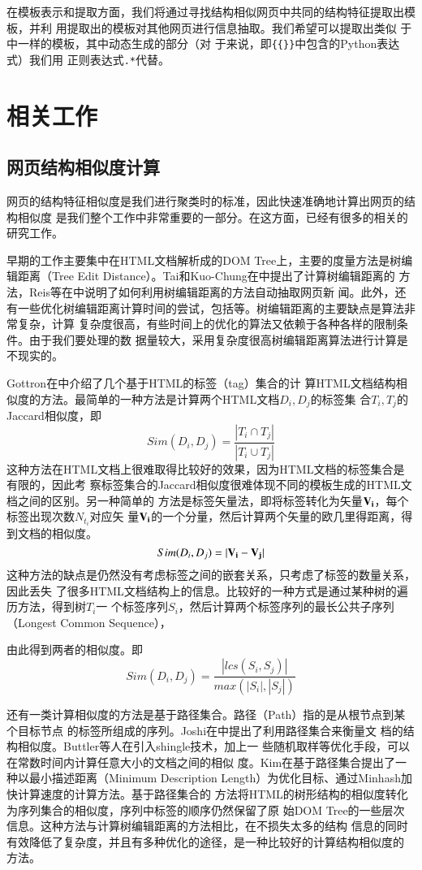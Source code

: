 在模板表示和提取方面，我们将通过寻找结构相似网页中共同的结构特征提取出模板，并利
用提取出的模板对其他网页进行信息抽取。我们希望可以提取出类似
于中一样的模板，其中动态生成的部分（对
于来说，即\texttt{\{\{\}\}}中包含的Python表达式）我们用
正则表达式\texttt{.*}代替。
\section{相关工作}
\label{sec:relatedwork}

\subsection{网页结构相似度计算}
\label{sec:relatedwork:sim}
网页的结构特征相似度是我们进行聚类时的标准，因此快速准确地计算出网页的结构相似度
是我们整个工作中非常重要的一部分。在这方面，已经有很多的相关的研究工作。

早期的工作主要集中在HTML文档解析成的DOM Tree上，主要的度量方法是树编辑距离（Tree
Edit Distance）。Tai和Kuo-Chung在中提出了计算树编辑距离的
方法，Reis等在中说明了如何利用树编辑距离的方法自动抽取网页新
闻。此外，还有一些优化树编辑距离计算时间的尝试，包括等。树编辑距离的主要缺点是算法非常复杂，计算
复杂度很高，有些时间上的优化的算法又依赖于各种各样的限制条件。由于我们要处理的数
据量较大，采用复杂度很高树编辑距离算法进行计算是不现实的。

Gottron在中介绍了几个基于HTML的标签（tag）集合的计
算HTML文档结构相似度的方法。最简单的一种方法是计算两个HTML文档$D_i,D_{j}$的标签集
合$T_i, T_j$的Jaccard相似度，即
\[
Sim(D_i,D_j)=\frac{|T_i \cap T_j|}{|T_i \cup T_j|}
\]
这种方法在HTML文档上很难取得比较好的效果，因为HTML文档的标签集合是有限的，因此考
察标签集合的Jaccard相似度很难体现不同的模板生成的HTML文档之间的区别。另一种简单的
方法是标签矢量法，即将标签转化为矢量$\mathbf{\bm{V_i}}$，每个标签出现次数$N_{t_i}$对应矢
量$\mathbf{\bm{V_i}}$的一个分量，然后计算两个矢量的欧几里得距离，得到文档的相似度。
\[
Sim(D_i,D_j)=|\mathbf{\bm{V_i}}-\mathbf{\bm{V_j}}|
\]
这种方法的缺点是仍然没有考虑标签之间的嵌套关系，只考虑了标签的数量关系，因此丢失
了很多HTML文档结构上的信息。比较好的一种方式是通过某种树的遍历方法，得到树$T_i$一
个标签序列$S_i$，然后计算两个标签序列的最长公共子序列（Longest Common Sequence），

由此得到两者的相似度。即
\[
Sim(D_i,D_j)=\frac{|lcs(S_i,S_j)|}{max(|S_i|,|S_j|)}
\]

还有一类计算相似度的方法是基于路径集合。路径（Path）指的是从根节点到某个目标节点
的标签所组成的序列。Joshi在中提出了利用路径集合来衡量文
档的结构相似度。Buttler等人在引入shingle技术，加上一
些随机取样等优化手段，可以在常数时间内计算任意大小的文档之间的相似
度。Kim在基于路径集合提出了一种以最小描述距离（Minimum
Description Length）为优化目标、通过Minhash加快计算速度的计算方法。基于路径集合的
方法将HTML的树形结构的相似度转化为序列集合的相似度，序列中标签的顺序仍然保留了原
始DOM Tree的一些层次信息。这种方法与计算树编辑距离的方法相比，在不损失太多的结构
信息的同时有效降低了复杂度，并且有多种优化的途径，是一种比较好的计算结构相似度的
方法。


